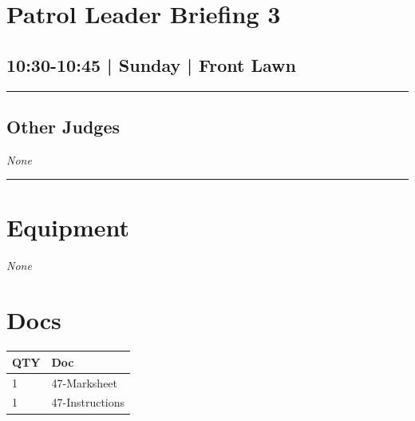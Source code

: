 \documentclass[10pt, A5]{article}
\begin{document}
        \begin{framed}
        \begin{minipage}{\textwidth}

        \setcounter{section}{71}
        \section{Patrol Leader Briefing 3}
        \subsection*{10:30-10:45 | Sunday | Front Lawn}

        \vspace{0.25cm}
        \hrule
        \vspace{0.25cm}


        \subsection*{Other Judges}
                \textit{None}

            \vspace{0.25cm}
        \hrule
        \vspace{0.25cm}

        \begin{multicols}{2}

		\section*{\faWrench \: Equipment}

				\textit{None}
		
		\vfill\null
		\columnbreak

			\section*{\faFile \: Docs}
		 	\begin{center}
			\begin{tabular}{p{2cm}p{4cm}}

			\textbf{QTY} & \textbf{Doc} \\\toprule
										1&47-Marksheet\\\midrule
										1&47-Instructions\\\midrule
							\end{tabular}
			\end{center}
	

		\vfill\null

		\end{multicols}
\end{minipage}
\end{framed}
\end{document}
